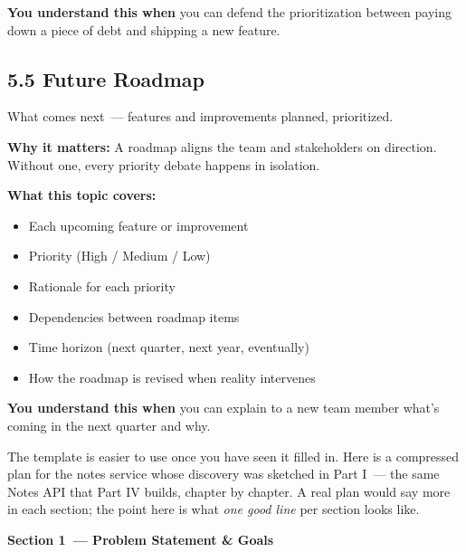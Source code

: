 \noindent{}\textbf{You understand this when} you can defend the prioritization between paying down a piece of debt and shipping a new feature.

\subsection*{5.5 Future Roadmap}\label{project-planning-guide:55-future-roadmap}

What comes next~--- features and improvements planned, prioritized.

\textbf{Why it matters:} A roadmap aligns the team and stakeholders on direction. Without one, every priority debate happens in isolation.

\textbf{What this topic covers:}

\begin{itemize}
\tightlist
\item
  Each upcoming feature or improvement
\item
  Priority (High / Medium / Low)
\item
  Rationale for each priority
\item
  Dependencies between roadmap items
\item
  Time horizon (next quarter, next year, eventually)
\item
  How the roadmap is revised when reality intervenes
\end{itemize}

\noindent{}\textbf{You understand this when} you can explain to a new team member what's coming in the next quarter and why.

\label{project-planning-guide:a-worked-example-planning-the-notes-api}

The template is easier to use once you have seen it filled in. Here is a compressed plan for the notes service whose discovery was sketched in Part I~--- the same Notes API that Part IV builds, chapter by chapter. A real plan would say more in each section; the point here is what \emph{one good line} per section looks like.

\textbf{Section 1~--- Problem Statement \& Goals}

